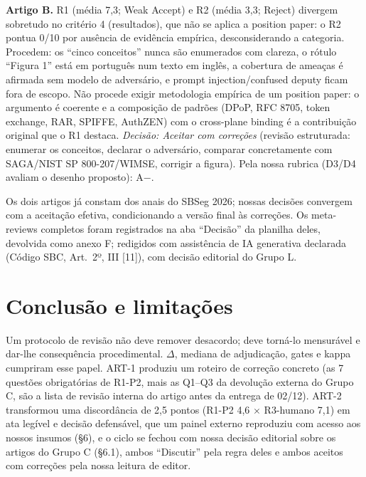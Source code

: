 \documentclass[10pt,a4paper,twocolumn]{article}
\begin{document}
\textbf{Artigo B.} R1 (média 7,3; Weak Accept) e R2 (média 3,3; Reject) divergem sobretudo no critério 4 (resultados), que não se aplica a position paper: o R2 pontua 0/10 por ausência de evidência empírica, desconsiderando a categoria. Procedem: os ``cinco conceitos'' nunca são enumerados com clareza, o rótulo ``Figura 1'' está em português num texto em inglês, a cobertura de ameaças é afirmada sem modelo de adversário, e prompt injection/confused deputy ficam fora de escopo. Não procede exigir metodologia empírica de um position paper: o argumento é coerente e a composição de padrões (DPoP, RFC 8705, token exchange, RAR, SPIFFE, AuthZEN) com o cross-plane binding é a contribuição original que o R1 destaca. \emph{Decisão: Aceitar com correções} (revisão estruturada: enumerar os conceitos, declarar o adversário, comparar concretamente com SAGA/NIST SP 800-207/WIMSE, corrigir a figura). Pela nossa rubrica (D3/D4 avaliam o desenho proposto): A$-$.

Os dois artigos já constam dos anais do SBSeg 2026; nossas decisões convergem com a aceitação efetiva, condicionando a versão final às correções. Os meta-reviews completos foram registrados na aba ``Decisão'' da planilha deles, devolvida como anexo F; redigidos com assistência de IA generativa declarada (Código SBC, Art.\ 2º, III [11]), com decisão editorial do Grupo L.

\section{Conclusão e limitações}

Um protocolo de revisão não deve remover desacordo; deve torná-lo mensurável e dar-lhe consequência procedimental. $\Delta$, mediana de adjudicação, gates e kappa cumpriram esse papel. ART-1 produziu um roteiro de correção concreto (as 7 questões obrigatórias de R1-P2, mais as Q1--Q3 da devolução externa do Grupo C, são a lista de revisão interna do artigo antes da entrega de 02/12). ART-2 transformou uma discordância de 2,5 pontos (R1-P2 4,6 $\times$ R3-humano 7,1) em ata legível e decisão defensável, que um painel externo reproduziu com acesso aos nossos insumos (\S6), e o ciclo se fechou com nossa decisão editorial sobre os artigos do Grupo C (\S6.1), ambos ``Discutir'' pela regra deles e ambos aceitos com correções pela nossa leitura de editor.
\end{document}
